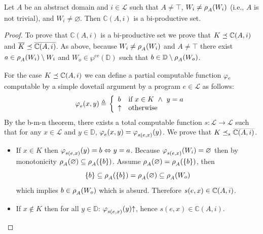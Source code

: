 \documentclass[runningheads]{llncs}
\def\ok#1{\mbox{\raisebox{0ex}[1ex][1ex]{$#1$}}}
\def\wpre{\wp^{\text{ce}}}
\def\bbbc{{\mathbb{C}}}
\newcommand{\ccL}{\mathscr{L}}
\newcommand{\Domain}{\mathbb{D}}
\newcommand{\pfunction}[3]{\ok{\varphi^{#2\, #3}_{#1}}}
\newcommand{\auco}[2]{\ok{\rho^{#1}_{#2}}}
\newcommand{\compl}[1]{\ok{\overline{#1}}}
\newcommand{\ud}{\ok{\:\triangleq\:}}
\def\ok#1{\mbox{\raisebox{0ex}[1ex][1ex]{$#1$}}}
\def\cAA{\ensuremath{A}}
\begin{document}
\begin{theorem}\label{productivity}
    Let $\cAA$ be an abstract domain and $i\in\ccL$ such that $\cAA\neq\top$, $W_i\neq\auco{}{A}(W_i)$ (i.e., $\cAA$ is not trivial), and $W_i\neq\varnothing$. Then $\bbbc(\cAA,i)$ is a bi-productive set.
\end{theorem}
\begin{proof}
    To prove that $\bbbc(\cAA,i)$ is a bi-productive set we prove that $\compl{K}\preceq \bbbc(\cAA,i)$ and $\compl{K}\preceq \compl{\bbbc(\cAA,i)}$. As above, because $W_i\neq\auco{}{A}(W_i)$ and $\cAA\neq\top$ there exist $a\in \auco{}{A}(W_i)\setminus W_i$ and $W_o\in\wpre(\Domain)$ such that $b\in\Domain\setminus\auco{}{A}(W_o)$.
    
    For the case $\compl{K}\preceq \bbbc(\cAA,i)$ we can define a partial computable function $\pfunction{e}{}{}$ computable by a simple dovetail argument by a program $e\in\ccL$ as follows:
    $$\pfunction{e}{}{}(x,y)\ud \left\{
    \begin{array}{ll}
       b & \mbox{if  $x\in K~\wedge~y=a$}\\
       \uparrow &\mbox{otherwise}
    \end{array}
    \right .
    $$
    By the b-m-n theorem, there exists a total computable function $s:\ccL\rightarrow\ccL$ such that for any $x\in\ccL$ and $y\in\Domain$, 
    $\pfunction{e}{}{}(x,y)=\pfunction{s(e,x)}{}{}(y)$. We prove that $K\preceq_{s}\compl{\bbbc(\cAA,i)}$.
    \begin{itemize}
        \item 
        If $x\in K$ then $\pfunction{s(e,x)}{}{}(y)=b\Leftrightarrow y=a$. Because $\pfunction{s(e,x)}{}{}(W_i)=\varnothing$ then by monotonicity $\auco{}{A}(\varnothing)\subseteq\auco{}{A}(\{b\})$. Assume $\auco{}{A}(\varnothing)=\auco{}{A}(\{b\})$, then
        \[
        \{b\}\subseteq\auco{}{A}(\{b\})=\auco{}{A}(\varnothing)
        \subseteq \auco{}{A}(W_o)
        \]
        which implies $b\in \auco{}{A}(W_o)$ which is absurd. Therefore $s(e,x)\in \compl{\bbbc(\cAA,i)}$.\\
        \item 
        If $x\not\in K$ then for all $y\in\Domain$:
        $\pfunction{s(e,x)}{}{}(y){\uparrow}$, hence $s(e,x)\in \bbbc(\cAA,i)$.
    \end{itemize}


\end{proof}
\end{document}
